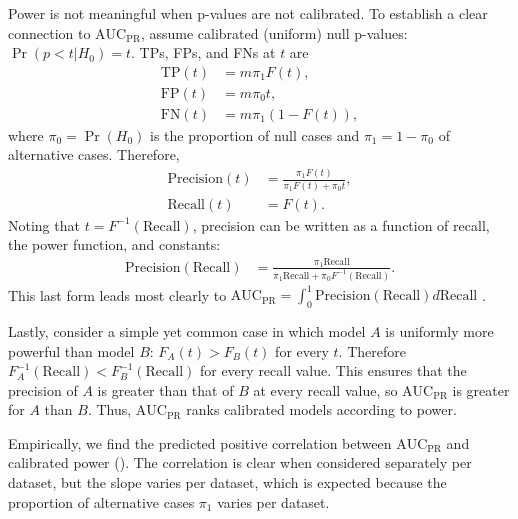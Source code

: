 \documentclass[9pt,lineno]{elife}
\newcommand{\auc}{\text{AUC}_\text{PR}}
\begin{document}
\begin{appendixbox}
  Power is not meaningful when p-values are not calibrated.
  To establish a clear connection to $\auc$, assume calibrated (uniform) null p-values: $\Pr( p < t | H_0 ) = t$.
  TPs, FPs, and FNs at $t$ are
    \begin{align*}
      \text{TP}(t)
      &=
        m \pi_1 F(t)
        , \\
      \text{FP}(t)
      &=
        m \pi_0 t
        , \\
      \text{FN}(t)
      &=
        m \pi_1 ( 1 - F(t) )
        ,
    \end{align*}
  where $\pi_0 = \Pr( H_0 )$ is the proportion of null cases and $\pi_1 = 1 - \pi_0$ of alternative cases.
  Therefore, 
    \begin{align*}
      \text{Precision}(t)
      &=
        \frac{ \pi_1 F(t) }{ \pi_1 F(t) + \pi_0 t }
        , \\
      \text{Recall}(t)
      &=
        F(t)
        .
    \end{align*}
  Noting that $t = F^{-1}( \text{Recall} )$, precision can be written as a function of recall, the power function, and constants:
    \begin{align*}
      \text{Precision}( \text{Recall} )
      &=
        \frac{ \pi_1 \text{Recall} }{ \pi_1 \text{Recall} + \pi_0 F^{-1}( \text{Recall} ) }
        .
    \end{align*}
  This last form leads most clearly to
  $
  \auc
  =
  \int_0^1 \text{Precision}( \text{Recall} ) d \text{Recall}
  $
  .

  Lastly, consider a simple yet common case in which model $A$ is uniformly more powerful than model $B$: $F_A(t) > F_B(t)$ for every $t$.
  Therefore $F_A^{-1}( \text{Recall} ) < F_B^{-1}( \text{Recall} )$ for every recall value.
  This ensures that the precision of $A$ is greater than that of $B$ at every recall value, so $\auc$ is greater for $A$ than $B$.
  Thus, $\auc$ ranks calibrated models according to power.

  Empirically, we find the predicted positive correlation between $\auc$ and calibrated power ().
  The correlation is clear when considered separately per dataset, but the slope varies per dataset, which is expected because the proportion of alternative cases $\pi_1$ varies per dataset.
\end{appendixbox}
\end{document}
